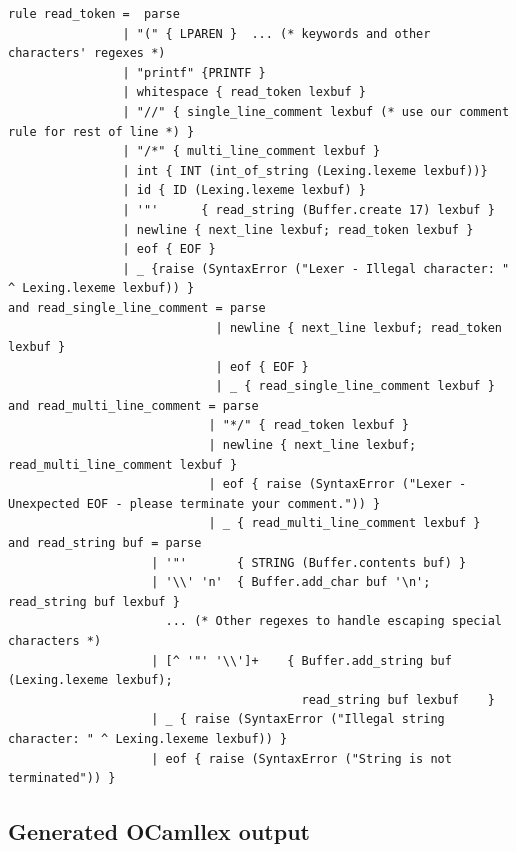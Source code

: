 

\begin{lstlisting}[caption={{lexer.mll}}]
rule read_token =  parse  
                | "(" { LPAREN }  ... (* keywords and other characters' regexes *)  
                | "printf" {PRINTF }  
                | whitespace { read_token lexbuf }  
                | "//" { single_line_comment lexbuf (* use our comment rule for rest of line *) } 
                | "/*" { multi_line_comment lexbuf }  
                | int { INT (int_of_string (Lexing.lexeme lexbuf))}  
                | id { ID (Lexing.lexeme lexbuf) }    
                | '"'      { read_string (Buffer.create 17) lexbuf }  
                | newline { next_line lexbuf; read_token lexbuf }  
                | eof { EOF }  
                | _ {raise (SyntaxError ("Lexer - Illegal character: " ^ Lexing.lexeme lexbuf)) }
and read_single_line_comment = parse  
                             | newline { next_line lexbuf; read_token lexbuf }  
                             | eof { EOF }  
                             | _ { read_single_line_comment lexbuf }
and read_multi_line_comment = parse  
                            | "*/" { read_token lexbuf }  
                            | newline { next_line lexbuf; read_multi_line_comment lexbuf }  
                            | eof { raise (SyntaxError ("Lexer - Unexpected EOF - please terminate your comment.")) }  
                            | _ { read_multi_line_comment lexbuf }
and read_string buf = parse  
                    | '"'       { STRING (Buffer.contents buf) }  
                    | '\\' 'n'  { Buffer.add_char buf '\n'; read_string buf lexbuf }  
                      ... (* Other regexes to handle escaping special characters *)  
                    | [^ '"' '\\']+    { Buffer.add_string buf (Lexing.lexeme lexbuf);      
                                         read_string buf lexbuf    }  
                    | _ { raise (SyntaxError ("Illegal string character: " ^ Lexing.lexeme lexbuf)) }  
                    | eof { raise (SyntaxError ("String is not terminated")) }
\end{lstlisting}

\hypertarget{generated-ocamllex-output}{%
\subsection{\texorpdfstring{\protect\hyperlink{generated-ocamllex-output}{}Generated
OCamllex
output}{Generated OCamllex output}}\label{generated-ocamllex-output}}

